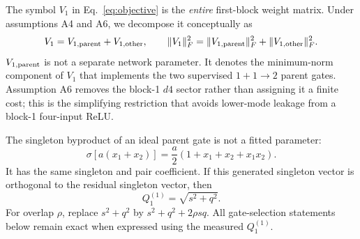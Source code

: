 \documentclass[10pt]{article}
\begin{document}
The symbol $V_1$ in Eq.~\eqref{eq:objective} is the \emph{entire} first-block weight matrix.
Under assumptions A4 and A6, we decompose it conceptually as
\begin{equation}
V_1=V_{1,\rm parent}+V_{1,\rm other},\qquad
\|V_1\|_F^2=\|V_{1,\rm parent}\|_F^2+\|V_{1,\rm other}\|_F^2.
\label{eq:v1-decomp}
\end{equation}
$V_{1,\rm parent}$ is not a separate network parameter.  It denotes the minimum-norm component
of $V_1$ that implements the two supervised $1+1\to2$ parent gates.  Assumption A6 removes the
block-1 $d4$ sector rather than assigning it a finite cost; this is the simplifying restriction
that avoids lower-mode leakage from a block-1 four-input ReLU.

The singleton byproduct of an ideal parent gate is not a fitted parameter:
\begin{equation}
\sigma\!\left[a(x_1+x_2)\right]
=\frac a2(1+x_1+x_2+x_1x_2).
\label{eq:relu-decomp}
\end{equation}
It has the same singleton and pair coefficient.  If this generated singleton vector is
orthogonal to the residual singleton vector, then
\begin{equation}
Q_1^{(1)}=\sqrt{s^2+q^2}.
\label{eq:q1out}
\end{equation}
For overlap $\rho$, replace $s^2+q^2$ by $s^2+q^2+2\rho sq$.  All gate-selection statements
below remain exact when expressed using the measured $Q_1^{(1)}$.
\end{document}
